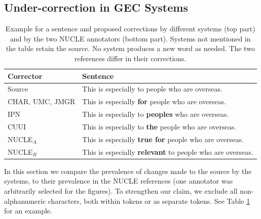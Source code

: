 \documentclass[11pt, a4paper]{article}
\begin{document}
\subsection{Under-correction in GEC Systems}\label{subsec:under-correction}
\begin{table}
	\centering
	\small
	\singlespacing
	\begin{tabular}{l|p{4cm}}
		Corrector & Sentence \\
		\hline
		Source & This is especially to people who are overseas. \\
		\hline 
		CHAR, UMC, JMGR & This is especially \textbf{for} people who are overseas. \\ 
		IPN & This is especially to \textbf{peoples} who are overseas. \\ 
		CUUI &  This is especially to \textbf{the} people who are overseas. \\ 
		\hline
		NUCLE$_A$ & This is especially \textbf{true for} people who are overseas.\\
		NUCLE$_B$ & This is especially \textbf{relevant} to people who are overseas.
	\end{tabular}
	\caption{\label{tab:nucle_example} Example for a sentence and proposed corrections by different systems (top part) and by the two NUCLE annotators (bottom part). Systems not mentioned in the table retain the source. No system produces a new word as needed. The two references differ in their corrections.} 
\end{table} 

In this section we compare the prevalence of changes made to the source by the systems,
to their prevalence in the NUCLE references (one annotator was arbitrarily 
selected for the figures). 
To strengthen our claim, we exclude all non-alphanumeric characters, 
both within tokens or as separate tokens. See Table \ref{tab:nucle_example} 
for an example.
\end{document}
